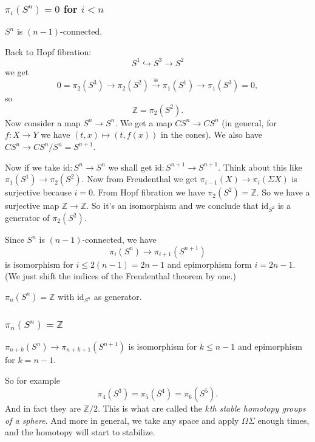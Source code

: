 \subsubsection{\texorpdfstring{$\pi_{i}(S^{n}
)=0$}{πᵢ(Sⁿ)}
for \texorpdfstring{$i<n$}{i<n}}
\label{subsection-s-for-i-n}

\begin{lemma}
\label{lemma-s-n-is-n-1-connected}
	$S^n$ is $(n-1)$-connected.
\end{lemma}
Back to Hopf fibration:
$$S^1\hookrightarrow S^3\to S^2$$
we get
$$0=\pi_2(S^3)\to\pi_2(S^2)\overset{\cong}
{\to}\pi_1(S^1)\to\pi_1(S^3)=0,$$
so
$$\mathbb{Z}=\pi_2(S^2).$$
Now consider a map $S^n\to S^n$. We get a map
$CS^n\to CS^n$ (in general, for $f:X\to Y$ we
have $(t,x)\mapsto(t,f(x))$ in the cones). We
also have $CS^n\to CS^n/S^n=S^{n+1}$.

Now if we take $\text{id}:S^n\to S^n$ we
shall get $\text{id}:S^{n+1}\to S^{n+1}$.
Think about this like
$\pi_1(S^1)\to\pi_2(S^2)$. Now from
Freudenthal we get
$\pi_{i-1}(X)\to\pi_i(\Sigma X)$ is
surjective because $i=0$. From Hopf fibration
we have $\pi_2(S^2)=\mathbb{Z}$. So we have a
surjective map $\mathbb{Z}\to\mathbb{Z}$. So
it's an isomorphism and we conclude that
$\text{id}_{S^2}$ is a generator of
$\pi_2(S^2)$.
\begin{lemma}
\label{lemma-since-s-n-n-1-conne-we-have}
	Since $S^n$ is $(n-1)$-connected, we have
	$$\pi_i(S^n)\to\pi_{i+1}(S^{n+1})$$
	is isomorphism for $i\leq 2(n-1)=2n-1$ and
	epimorphism form $i=2n-1$. (We just shift
	the indices of the Freudenthal theorem by
	one.)
\end{lemma}
\begin{lemma}
\label{lemma-n-s-n-z-id-s-n-as-gener}
	$\pi_n(S^n)=\mathbb{Z}$ with
	$\text{id}_{S^n}$ as generator.
\end{lemma}

\subsubsection{$\pi_{n}(S^{n})=\mathbb{Z}$}
\label{subsection-n-s-n-z}
\begin{lemma}
\label{lemma-n-k-s-n-n-k-1-s-n-1-isomo}
	$\pi_{n+k}(S^n)\to\pi_{n+k+1}(S^{n+1})$ is
	isomorphism for $k\leq n-1$ and epimorphism
	for $k=n-1$.
\end{lemma}
So for example
$$\pi_4(S^3)=\pi_5(S^4)=\pi_6(S^5).$$
And in fact they are $\mathbb{Z}/2$. This is
what are called the {\it $k$th stable
homotopy groups of a sphere}. And more in
general, we take any space and apply
$\Omega\Sigma$ enough times, and the homotopy
will start to stabilize.

